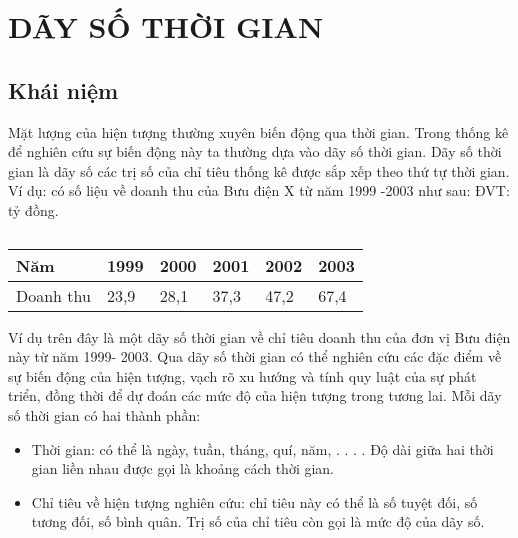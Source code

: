 \section{DÃY SỐ THỜI GIAN} 
\label{sec:intro:timeseries}
\subsection{Khái niệm}
Mặt lượng của hiện tượng thường xuyên biến động qua thời gian. Trong thống kê để nghiên cứu sự biến động này ta thường dựa vào dãy số thời gian.
Dãy số thời gian là dãy số các trị số của chỉ tiêu thống kê được sắp xếp theo thứ tự thời gian.
Ví dụ: có số liệu về doanh thu của Bưu điện X từ năm 1999 -2003 như sau: ĐVT: tỷ đồng.
\begin{table}[h]
	\begin{tabularx}{\textwidth}{X | X | X | X | X | X} 
		Năm		& 1999  & 2000  & 2001  & 2002  & 2003  		\\ \hline
		Doanh thu   & 23,9 & 28,1   & 37,3  & 47,2   	&67,4		\\ %
	\end{tabularx}
	\label{tab:table2}
	\caption{}
\end{table}
Ví dụ trên đây là một dãy số thời gian về chỉ tiêu doanh thu của đơn vị Bưu điện này từ năm 1999- 2003. Qua dãy số thời gian có thể nghiên cứu các đặc điểm về sự biến động của hiện tượng, vạch rõ xu hướng và tính quy luật của sự phát triển, đồng thời để dự đoán các mức độ của hiện tượng trong tương lai.
Mỗi dãy số thời gian có hai thành phần:
\begin{itemize}
    \item Thời gian: có thể là ngày, tuần, tháng, quí, năm, . . . . Độ dài giữa hai thời gian liền nhau được gọi là khoảng cách thời gian. \\
    \item Chỉ tiêu về hiện tượng nghiên cứu: chỉ tiêu này có thể là số tuyệt đối, số tương đối, số bình quân. Trị số của chỉ tiêu còn gọi là mức độ của dãy số. \\
\end{itemize}

